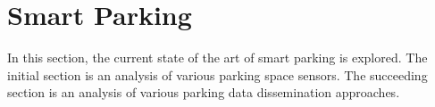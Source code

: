 \section{Smart Parking}
In this section, the current state of the art of smart parking is explored. The initial section is an analysis of various parking space sensors. The succeeding section is an analysis of various parking data dissemination approaches.